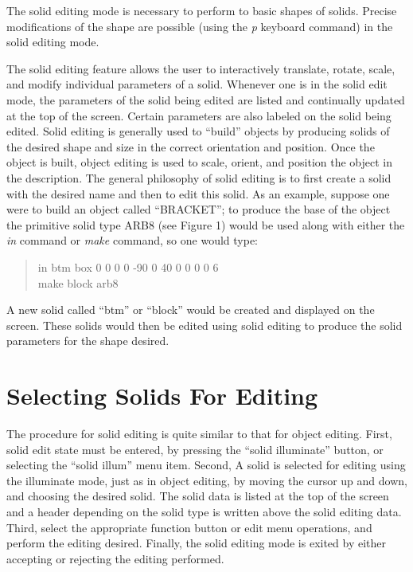 The solid editing mode is necessary to
perform to basic shapes of solids.
Precise modifications
of the shape are possible (using the {\em p} keyboard command) in the solid
editing mode.

The solid editing feature allows the user to interactively translate,
rotate, scale, and modify individual parameters of a solid.  Whenever one is
in the solid edit mode, the parameters of the solid being edited are listed
and continually updated at the top of the screen.  Certain parameters are
also labeled on the solid being edited.  Solid editing  is generally used to
``build'' objects by producing solids of the desired shape and size in the
correct orientation and position.  Once the object is built, object editing
is used to scale, orient, and position the object in the description.  The
general philosophy of solid editing is to first create a solid with the
desired name and then to edit this solid.  As an example, suppose one were
to build an object called ``BRACKET''; to produce the base of the object the
primitive solid type ARB8 (see Figure 1) would be used along with either the
{\em in} command or {\em make} command, so one would type:
\begin{verse}
     in btm box 0 0 0  0 -90 0  40 0 0  0 0 6 \\
     make block arb8
\end{verse}
A new solid called ``btm'' or ``block'' would be created and displayed on the
screen.  These solids would then be edited using solid editing to produce the
solid parameters for the shape desired.

\section{Selecting Solids For Editing}

The procedure for solid editing is quite similar to that for object editing.
First, solid edit state must be entered, by pressing the
``solid illuminate'' button, or selecting the ``solid illum'' menu item.
Second,
A solid is selected for
editing using the illuminate mode, just as in object editing,
by moving the cursor up and down, and choosing the desired solid.
The solid data is listed at the top of the screen and a
header depending on the solid type is written above the solid editing data.
Third, select the appropriate function button or edit menu operations,
and perform the editing desired.  Finally, the solid
editing mode is exited
by either accepting or rejecting the editing performed.

